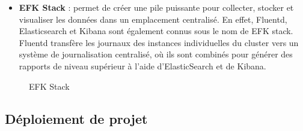 \begin{itemize}
\begin{table}[H]
\begin{center}
\begin{tabularx}{\textwidth}{ |p{5cm}|X|X|X|X| }
\end{tabularx}
\caption{Configuration SonarQube}
\end{center}
\end{table}


\textcolor{red}{\textbf{Remarque}} : On donne la note (Rate) suivant les r\`egles suivantes :

\begin{itemize}
\item <=5\% la note est A
\item entre 6 to 10\% la note est B
\item entre 11 to 20\% la note est C
\item entre 21 to 50\% la note est D
\item >50\% la note est E
\end{itemize}

\item \textbf{EFK Stack} : permet de cr\'eer une pile puissante pour collecter, stocker et visualiser les donn\'ees dans un emplacement centralis\'e. En effet, Fluentd, Elasticsearch et Kibana sont \'egalement connus sous le nom de EFK stack. Fluentd transf\`ere les journaux des instances individuelles du cluster vers un syst\`eme de journalisation centralis\'e, o\`u ils sont combin\'es pour g\'en\'erer des rapports de niveau sup\'erieur \`a l'aide d'ElasticSearch et de Kibana.
\end{itemize}


\begin{figure}[H]
	\caption{\label{fig:my-label} EFK Stack}
\end{figure}


\subsection{D\'eploiement de projet}

